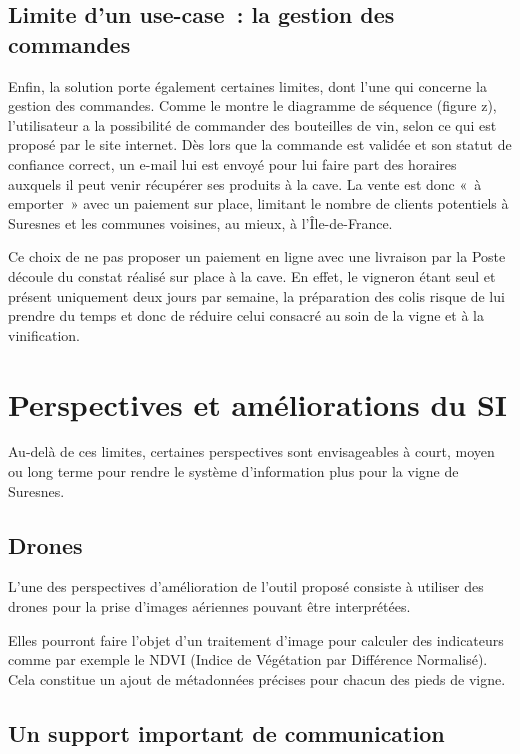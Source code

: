 \documentclass[a4paper, titlepage]{report}
\begin{document}
\subsection{Limite d'un use-case~: la gestion des commandes}

Enfin, la solution porte également certaines limites, dont l'une qui
concerne la gestion des commandes. Comme le montre le diagramme de
séquence (figure z), l'utilisateur a la possibilité de commander des
bouteilles de vin, selon ce qui est proposé par le site internet. Dès
lors que la commande est validée et son statut de confiance correct, un
e-mail lui est envoyé pour lui faire part des horaires auxquels il peut
venir récupérer ses produits à la cave. La vente est donc «~à emporter~»
avec un paiement sur place, limitant le nombre de clients potentiels à
Suresnes et les communes voisines, au mieux, à l'Île-de-France.

Ce choix de ne pas proposer un paiement en ligne avec une livraison par
la Poste découle du constat réalisé sur place à la cave. En effet, le
vigneron étant seul et présent uniquement deux jours par semaine, la
préparation des colis risque de lui prendre du temps et donc de réduire
celui consacré au soin de la vigne et à la vinification.

\section{Perspectives et améliorations du SI}

Au-delà de ces limites, certaines perspectives sont envisageables à
court, moyen ou long terme pour rendre le système d'information plus
pour la vigne de Suresnes.

\subsection{Drones}

L'une des perspectives d'amélioration de l'outil proposé consiste à utiliser des drones pour la prise d'images aériennes pouvant être interprétées.

Elles pourront faire l'objet d'un traitement d'image pour calculer des indicateurs comme par exemple le NDVI (Indice de Végétation par Différence Normalisé). Cela constitue un ajout de métadonnées précises pour chacun des pieds de vigne. 

\subsection{Un support important de communication}
\end{document}
